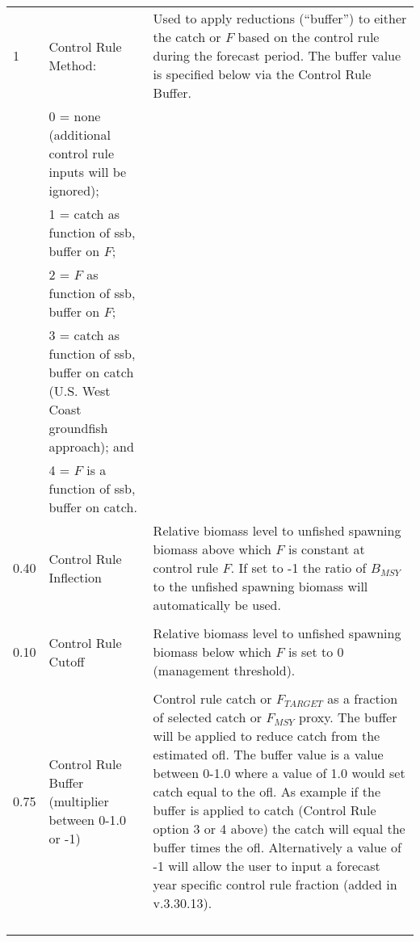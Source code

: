\begin{landscape}
{\begin{longtable}{p{2cm} p{7cm} p{12cm}}
  \hline
  1 & Control Rule Method: & \multirow{1}{1cm}[-0.15cm]{\parbox{12cm}{Used to apply reductions (``buffer'') to either the catch or $F$ based on the control rule during the forecast period. The buffer value is specified below via the Control Rule Buffer.}} \Tstrut\\
    & 0 = none (additional control rule inputs will be ignored); & \\
    & 1 = catch as function of \gls{ssb}, buffer on $F$; & \\
    & 2 = $F$ as function of \gls{ssb}, buffer on $F$; & \\
    & 3 = catch as function of \gls{ssb}, buffer on catch (U.S. West Coast groundfish approach); and & \\
    & 4 = $F$ is a function of \gls{ssb}, buffer on catch. & \Bstrut\\
  \hline

  0.40 \Tstrut & Control Rule Inflection & \multirow{1}{1cm}[-0.2cm]{\parbox{12cm}{Relative biomass level to unfished spawning biomass above which $F$ is constant at control rule $F$. If set to -1 the ratio of $B_{MSY}$ to the unfished spawning biomass will automatically be used.}} \Bstrut\\
    & & \Tstrut\Bstrut\\

  \hline
  0.10 \Tstrut & Control Rule Cutoff & \multirow{1}{1cm}[-0.2cm]{\parbox{12cm}{Relative biomass level to unfished spawning biomass below which $F$ is set to 0 (management threshold).}} \\
    & & \\

  \hline
  0.75 \Tstrut & Control Rule Buffer (multiplier between 0-1.0 or -1) & \multirow{1}{1cm}[-0.25cm]{\parbox{12cm}{Control rule catch or $F_{TARGET}$ as a fraction of selected catch or $F_{MSY}$ proxy. The buffer will be applied to reduce catch from the estimated \gls{ofl}. The buffer value is a value between 0-1.0 where a value of 1.0 would set catch equal to the \gls{ofl}. As example if the buffer is applied to catch (Control Rule option 3 or 4 above) the catch will equal the buffer times the \gls{ofl}. Alternatively a value of -1 will allow the user to input a forecast year specific control rule fraction (added in v.3.30.13).}} \Bstrut\\ 
    & & \Bstrut\\
    & & \Bstrut\\
    & & \Bstrut\\
    & & \Bstrut\\


\end{longtable}}
\end{landscape}
